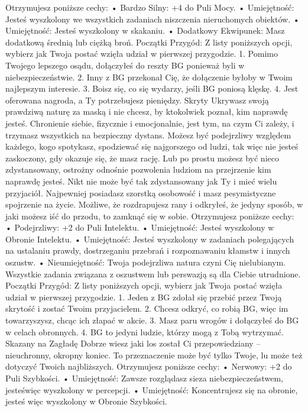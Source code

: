 Otrzymujesz poniższe cechy:
    • Bardzo Silny: +4 do Puli Mocy.
    • Umiejętność: Jesteś wyszkolony we wszystkich zadaniach niszczenia nieruchomych obiektów.
    • Umiejętność: Jesteś wyszkolony w skakaniu.
    • Dodatkowy Ekwipunek: Masz dodatkową średnią lub ciężką broń.
Początki Przygód: Z listy poniższych opcji, wybierz jak Twoja postać wzięła udział w pierwszej przygodzie.
1. Pomimo Twojego lepszego osądu, dołączyłeś do reszty BG ponieważ byli w niebezpieczeństwie.
2. Inny z BG przekonał Cię, że dołączenie byłoby w Twoim najlepszym interesie.
3. Boisz się, co się wydarzy, jeśli BG poniosą klęskę.
4. Jest oferowana nagroda, a Ty potrzebujesz pieniędzy.
Skryty
Ukrywasz swoją prawdziwą naturę za maską i nie chcesz, by ktokolwiek poznał, kim naprawdę jesteś. Chronienie siebie, fizycznie i emocjonalnie, jest tym, na czym Ci zależy, i trzymasz wszystkich na bezpieczny dystans. Możesz być podejrzliwy względem każdego, kogo spotykasz, spodziewać się najgorszego od ludzi, tak więc nie jesteś zaskoczony, gdy okazuje się, że masz rację. Lub po prostu możesz być nieco zdystansowany, ostrożny odnośnie pozwolenia ludziom na przejrzenie kim naprawdę jesteś.
Nikt nie może być tak zdystansowany jak Ty i mieć wielu przyjaciół. Najpewniej posiadasz szorstką osobowość i masz pesymistyczne spojrzenie na życie. Możliwe, że rozdrapujesz rany i odkryłeś, że jedyny sposób, w jaki możesz iść do przodu, to zamknąć się w sobie.
Otrzymujesz poniższe cechy:
    • Podejrzliwy: +2 do Puli Intelektu.
    • Umiejętność: Jesteś wyszkolony w Obronie Intelektu.
    • Umiejętność: Jesteś wyszkolony w zadaniach polegających na ustalaniu prawdy, dostrzeganiu przebrań i rozpoznawaniu kłamstw i innych oszustw.
    • Nieumiejętność: Twoja podejrzliwa natura czyni Cię nielubianym. Wszystkie zadania związana z oszustwem lub perswazją są dla Ciebie utrudnione.
Początki Przygód: Z listy poniższych opcji, wybierz jak Twoja postać wzięła udział w pierwszej przygodzie.
1. Jeden z BG zdołał się przebić przez Twoją skrytość i zostać Twoim przyjacielem.
2. Chcesz odkryć, co robią BG, więc im towarzyszysz, chcąc ich złapać w akcie.
3. Masz paru wrogów i dołączyłeś do BG w celach obronnych.
4. BG to jedyni ludzie, którzy mogą z Tobą wytrzymać.
Skazany na Zagładę
Dobrze wiesz jaki los został Ci przepowiedziany – nieuchronny, okropny koniec. To przeznaczenie może być tylko Twoje, lu może też dotyczyć Twoich najbliższych.
Otrzymujesz poniższe cechy:
    • Nerwowy: +2 do Puli Szybkości.
    • Umiejętność: Zawsze rozglądasz sieza niebezpieczeństwem, jesteświęc wyszkolony w percepcji.
    • Umiejętność: Koncentrujesz się na obronie, jesteś więc wyszkolony w Obronie Szybkości.
